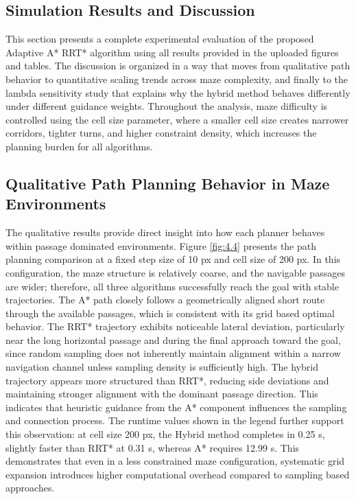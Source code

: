 \documentclass[a4paper,12pt,one side]{report}
\theoremstyle{definition}
\begin{document}
\begin{itemize}
\section{Simulation Results and Discussion}

This section presents a complete experimental evaluation of the proposed Adaptive A* RRT* algorithm using all results provided in the uploaded figures and tables. The discussion is organized in a way that moves from qualitative path behavior to quantitative scaling trends across maze complexity, and finally to the lambda sensitivity study that explains why the hybrid method behaves differently under different guidance weights. Throughout the analysis, maze difficulty is controlled using the cell size parameter, where a smaller cell size creates narrower corridors, tighter turns, and higher constraint density, which increases the planning burden for all algorithms.

\subsection{Qualitative Path Planning Behavior in Maze Environments}

The qualitative results provide direct insight into how each planner behaves within passage dominated environments. Figure \ref{fig:4.4} presents the path planning comparison at a fixed step size of 10 px and cell size of 200 px. In this configuration, the maze structure is relatively coarse, and the navigable passages are wider; therefore, all three algorithms successfully reach the goal with stable trajectories. The A* path closely follows a geometrically aligned short route through the available passages, which is consistent with its grid based optimal behavior. The RRT* trajectory exhibits noticeable lateral deviation, particularly near the long horizontal passage and during the final approach toward the goal, since random sampling does not inherently maintain alignment within a narrow navigation channel unless sampling density is sufficiently high. The hybrid trajectory appears more structured than RRT*, reducing side deviations and maintaining stronger alignment with the dominant passage direction. This indicates that heuristic guidance from the A* component influences the sampling and connection process. The runtime values shown in the legend further support this observation: at cell size 200 px, the Hybrid method completes in 0.25 s, slightly faster than RRT* at 0.31 s, whereas A* requires 12.99 s. This demonstrates that even in a less constrained maze configuration, systematic grid expansion introduces higher computational overhead compared to sampling based approaches.


\end{itemize}
\end{document}
